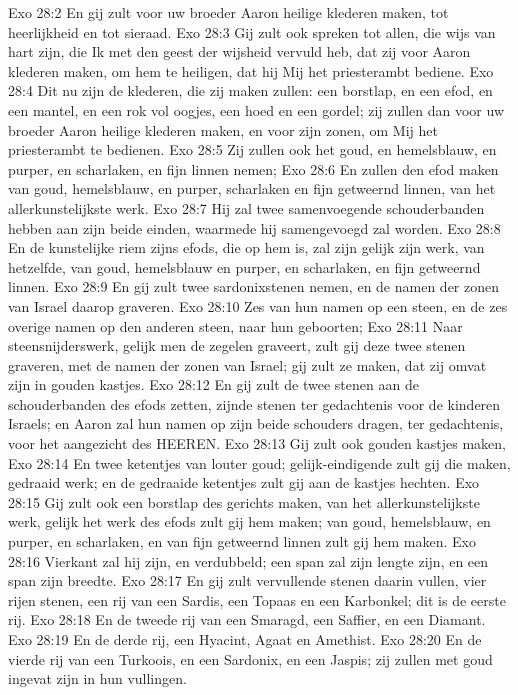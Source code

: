 Exo 28:2  En gij zult voor uw broeder Aaron heilige klederen maken, tot heerlijkheid en tot sieraad.
Exo 28:3  Gij zult ook spreken tot allen, die wijs van hart zijn, die Ik met den geest der wijsheid vervuld heb, dat zij voor Aaron klederen maken, om hem te heiligen, dat hij Mij het priesterambt bediene.
Exo 28:4  Dit nu zijn de klederen, die zij maken zullen: een borstlap, en een efod, en een mantel, en een rok vol oogjes, een hoed en een gordel; zij zullen dan voor uw broeder Aaron heilige klederen maken, en voor zijn zonen, om Mij het priesterambt te bedienen.
Exo 28:5  Zij zullen ook het goud, en hemelsblauw, en purper, en scharlaken, en fijn linnen nemen;
Exo 28:6  En zullen den efod maken van goud, hemelsblauw, en purper, scharlaken en fijn getweernd linnen, van het allerkunstelijkste werk.
Exo 28:7  Hij zal twee samenvoegende schouderbanden hebben aan zijn beide einden, waarmede hij samengevoegd zal worden.
Exo 28:8  En de kunstelijke riem zijns efods, die op hem is, zal zijn gelijk zijn werk, van hetzelfde, van goud, hemelsblauw en purper, en scharlaken, en fijn getweernd linnen.
Exo 28:9  En gij zult twee sardonixstenen nemen, en de namen der zonen van Israel daarop graveren.
Exo 28:10  Zes van hun namen op een steen, en de zes overige namen op den anderen steen, naar hun geboorten;
Exo 28:11  Naar steensnijderswerk, gelijk men de zegelen graveert, zult gij deze twee stenen graveren, met de namen der zonen van Israel; gij zult ze maken, dat zij omvat zijn in gouden kastjes.
Exo 28:12  En gij zult de twee stenen aan de schouderbanden des efods zetten, zijnde stenen ter gedachtenis voor de kinderen Israels; en Aaron zal hun namen op zijn beide schouders dragen, ter gedachtenis, voor het aangezicht des HEEREN.
Exo 28:13  Gij zult ook gouden kastjes maken,
Exo 28:14  En twee ketentjes van louter goud; gelijk-eindigende zult gij die maken, gedraaid werk; en de gedraaide ketentjes zult gij aan de kastjes hechten.
Exo 28:15  Gij zult ook een borstlap des gerichts maken, van het allerkunstelijkste werk, gelijk het werk des efods zult gij hem maken; van goud, hemelsblauw, en purper, en scharlaken, en van fijn getweernd linnen zult gij hem maken.
Exo 28:16  Vierkant zal hij zijn, en verdubbeld; een span zal zijn lengte zijn, en een span zijn breedte.
Exo 28:17  En gij zult vervullende stenen daarin vullen, vier rijen stenen, een rij van een Sardis, een Topaas en een Karbonkel; dit is de eerste rij.
Exo 28:18  En de tweede rij van een Smaragd, een Saffier, en een Diamant.
Exo 28:19  En de derde rij, een Hyacint, Agaat en Amethist.
Exo 28:20  En de vierde rij van een Turkoois, en een Sardonix, en een Jaspis; zij zullen met goud ingevat zijn in hun vullingen.
